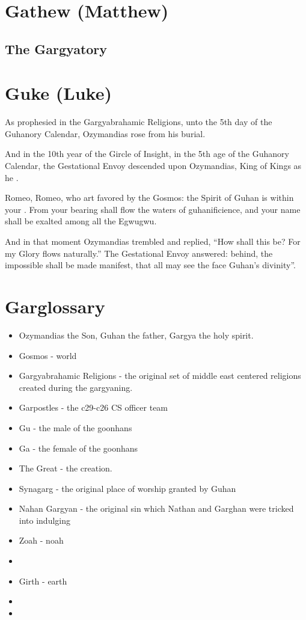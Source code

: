 \documentclass{article}
\begin{document}
\section{Gathew (Matthew)}

\subsection{The Gargyatory}

\section{Guke (Luke)}

As prophesied in the Gargyabrahamic Religions, unto the 5th day of the Guhanory Calendar, Ozymandias rose from his burial. 

And in the 10th year of the Gircle of Insight, in the 5th age of the Guhanory Calendar, the Gestational Envoy descended upon Ozymandias, King of Kings as he . 

Romeo, Romeo, who art favored by the Gosmos: the Spirit of Guhan is within your . From your bearing shall flow the waters of guhanificience, and your name shall be exalted among all the Egwugwu.

And in that moment Ozymandias trembled and replied, “How shall this be? For my Glory flows naturally.” The Gestational Envoy answered:  behind, the impossible shall be made manifest, that all may see the face Guhan’s divinity”.

\section{Garglossary}

\begin{itemize}
  \item Ozymandias the Son, Guhan the father, Gargya the holy spirit.
  \item Gosmos - world
  \item Gargyabrahamic Religions - the original set of middle east centered religions created during the gargyaning.
  \item Garpostles - the c29-c26 CS officer team
  \item Gu - the male of the goonhans
  \item Ga - the female of the goonhans
  \item The Great  - the creation.
  \item Synagarg - the original place of worship granted by Guhan
  \item Nahan Gargyan - the original sin which Nathan and Garghan were tricked into indulging
  \item Zoah - noah
  \item {}
  \item Girth - earth
  \item {}
  \item {}
\end{itemize}
\end{document}
